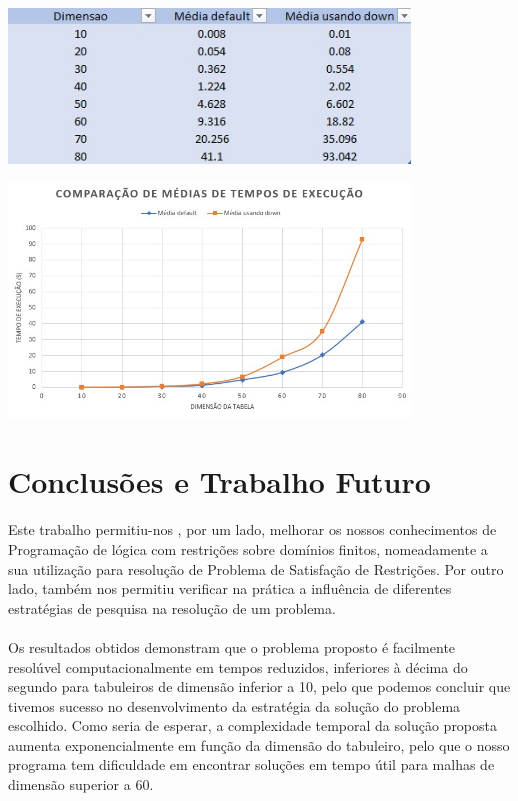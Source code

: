 \documentclass[11pt]{article}
\begin{document}
\begin{center}

	\includegraphics[width=0.8\textwidth]{tabela-comparacao.jpg}

	\includegraphics[width=0.8\textwidth]{grafico-comparacao.jpg}

\end{center}

\pagebreak

\section{Conclusões e Trabalho Futuro} 
\paragraph{}
Este trabalho permitiu-nos	, por um lado, melhorar os nossos conhecimentos de Programação de lógica com restrições sobre domínios finitos, nomeadamente a sua utilização para resolução de Problema de Satisfação de Restrições. Por outro lado, também nos permitiu verificar na prática a influência de diferentes estratégias de pesquisa na resolução de um problema.

\paragraph{}
Os resultados obtidos demonstram que o problema proposto é facilmente resolúvel computacionalmente em tempos reduzidos, inferiores à décima do segundo para tabuleiros de dimensão inferior a 10, pelo que podemos concluir que tivemos sucesso no desenvolvimento da estratégia da solução do problema escolhido. Como seria de esperar, a complexidade temporal da solução proposta aumenta exponencialmente em função da dimensão do tabuleiro, pelo que o nosso programa tem dificuldade em encontrar soluções em tempo útil para malhas de dimensão superior a 60.
\end{document}
